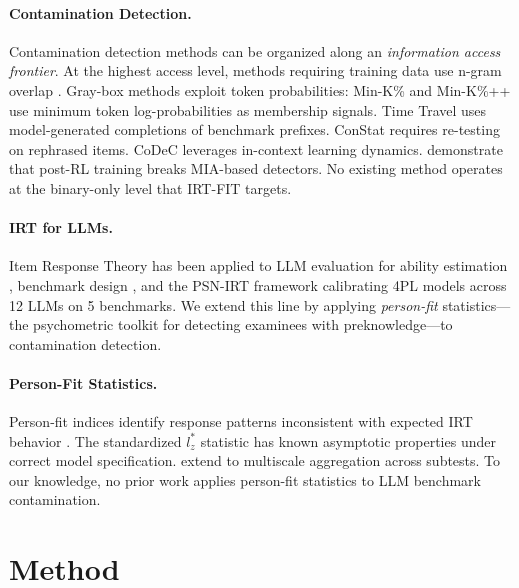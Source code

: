 \documentclass[11pt,a4paper]{article}
\begin{document}
\paragraph{Contamination Detection.}
Contamination detection methods can be organized along an \emph{information access frontier}. At the highest access level, methods requiring training data use n-gram overlap \citep{dodge2021documenting}. Gray-box methods exploit token probabilities: Min-K\% \citep{shi2024detecting} and Min-K\%++ use minimum token log-probabilities as membership signals. Time Travel \citep{dong2024generalization} uses model-generated completions of benchmark prefixes. ConStat \citep{dekoninck2024constat} requires re-testing on rephrased items. CoDeC \citep{dong2024codec} leverages in-context learning dynamics. \citet{wang2025post} demonstrate that post-RL training breaks MIA-based detectors. No existing method operates at the binary-only level that IRT-FIT targets.

\paragraph{IRT for LLMs.}
Item Response Theory has been applied to LLM evaluation for ability estimation \citep{polo2024tinybenchmarks}, benchmark design \citep{rodriguez2021evaluation}, and the PSN-IRT framework \citep{gu2024psn} calibrating 4PL models across 12 LLMs on 5 benchmarks. We extend this line by applying \emph{person-fit} statistics---the psychometric toolkit for detecting examinees with preknowledge---to contamination detection.

\paragraph{Person-Fit Statistics.}
Person-fit indices identify response patterns inconsistent with expected IRT behavior \citep{karabatsos2003comparing}. The standardized $l_z^*$ statistic \citep{snijders2001item} has known asymptotic properties under correct model specification. \citet{hong2021multiscale} extend to multiscale aggregation across subtests. To our knowledge, no prior work applies person-fit statistics to LLM benchmark contamination.

\section{Method}
\end{document}
